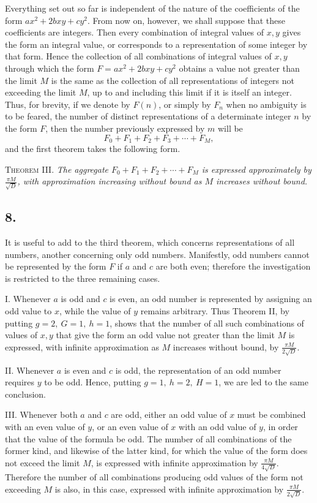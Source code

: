 \documentclass[12pt]{article}
\begin{document}
Everything set out so far is independent of the nature of the coefficients of the form $ax^2+2bxy+cy^2$. From now on, however, we shall suppose that these coefficients are integers. Then every combination of integral values of $x,y$ gives the form an integral value, or corresponds to a representation of some integer by that form. Hence the collection of all combinations of integral values of $x,y$ through which the form $F=ax^2+2bxy+cy^2$ obtains a value not greater than the limit $M$ is the same as the collection of all representations of integers not exceeding the limit $M$, up to and including this limit if it is itself an integer. Thus, for brevity, if we denote by $F(n)$, or simply by $F_n$ when no ambiguity is to be feared, the number of distinct representations of a determinate integer $n$ by the form $F$, then the number previously expressed by $m$ will be
\[
F_0+F_1+F_2+F_3+\cdots+F_M,
\]
and the first theorem takes the following form.

\textsc{Theorem III.} \emph{The aggregate $F_0+F_1+F_2+\cdots+F_M$ is expressed approximately by $\frac{\pi M}{\sqrt D}$, with approximation increasing without bound as $M$ increases without bound.}

\subsection*{8.}

It is useful to add to the third theorem, which concerns representations of all numbers, another concerning only odd numbers. Manifestly, odd numbers cannot be represented by the form $F$ if $a$ and $c$ are both even; therefore the investigation is restricted to the three remaining cases.

I. Whenever $a$ is odd and $c$ is even, an odd number is represented by assigning an odd value to $x$, while the value of $y$ remains arbitrary. Thus Theorem II, by putting $g=2,\ G=1,\ h=1$, shows that the number of all such combinations of values of $x,y$ that give the form an odd value not greater than the limit $M$ is expressed, with infinite approximation as $M$ increases without bound, by $\frac{\pi M}{2\sqrt D}$.

II. Whenever $a$ is even and $c$ is odd, the representation of an odd number requires $y$ to be odd. Hence, putting $g=1,\ h=2,\ H=1$, we are led to the same conclusion.

III. Whenever both $a$ and $c$ are odd, either an odd value of $x$ must be combined with an even value of $y$, or an even value of $x$ with an odd value of $y$, in order that the value of the formula be odd. The number of all combinations of the former kind, and likewise of the latter kind, for which the value of the form does not exceed the limit $M$, is expressed with infinite approximation by $\frac{\pi M}{4\sqrt D}$. Therefore the number of all combinations producing odd values of the form not exceeding $M$ is also, in this case, expressed with infinite approximation by $\frac{\pi M}{2\sqrt D}$.
\end{document}
